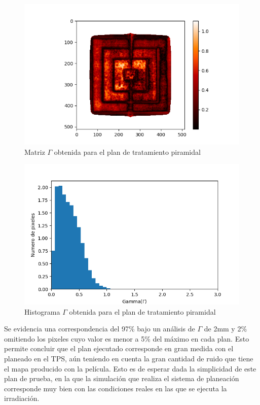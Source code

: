 \begin{figure}[H]
	\centering
	\includegraphics[width=0.9\linewidth]{images/gammaPiramideCalor.png}
	\caption{Matriz $\Gamma$ obtenida para el plan de tratamiento piramidal }
	\label{fig:matrixGAmmaPiramide}
\end{figure}
\begin{figure}[H]
	\centering
	\includegraphics[width=0.9\linewidth]{images/histogramaGammaPiramide.png}
	\caption{Histograma $\Gamma$ obtenida para el plan de tratamiento piramidal  }
	\label{fig:histogramaGAmmaPiramide}
\end{figure}

Se evidencia una correspondencia del 97\% bajo un análisis de $\Gamma$ de 2mm y 2\% omitiendo los pixeles cuyo valor es menor a 5\% del máximo en cada plan. Esto permite concluir que el plan ejecutado corresponde en gran medida con el planeado en el TPS, aún teniendo en cuenta la gran cantidad de ruido  que tiene el mapa producido con la película. Esto es de esperar dada la simplicidad de este plan de prueba, en la que la simulación que realiza el sistema de planeación corresponde muy bien con las condiciones reales en las que se ejecuta la irradiación.\\

